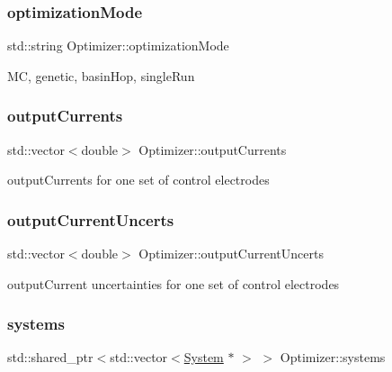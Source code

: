 \subsubsection{\texorpdfstring{optimization\+Mode}{optimizationMode}}
{\footnotesize\ttfamily std\+::string Optimizer\+::optimization\+Mode\hspace{0.3cm}{\ttfamily [private]}}

MC, genetic, basin\+Hop, single\+Run \mbox{\label{classOptimizer_af36d52fa81a2f38b5cb419e2c800fad6}} 
\subsubsection{\texorpdfstring{output\+Currents}{outputCurrents}}
{\footnotesize\ttfamily std\+::vector$<$double$>$ Optimizer\+::output\+Currents\hspace{0.3cm}{\ttfamily [private]}}

output\+Currents for one set of control electrodes \mbox{\label{classOptimizer_a65b7546e16edb4ea05a041812590a873}} 
\subsubsection{\texorpdfstring{output\+Current\+Uncerts}{outputCurrentUncerts}}
{\footnotesize\ttfamily std\+::vector$<$double$>$ Optimizer\+::output\+Current\+Uncerts\hspace{0.3cm}{\ttfamily [private]}}

output\+Current uncertainties for one set of control electrodes \mbox{\label{classOptimizer_a73db0a3546c6d5fab4237de7dd961f89}} 
\subsubsection{\texorpdfstring{systems}{systems}}
{\footnotesize\ttfamily std\+::shared\+\_\+ptr$<$std\+::vector$<$\hyperlink{classSystem}{System} $\ast$ $>$ $>$ Optimizer\+::systems\hspace{0.3cm}{\ttfamily [private]}}

